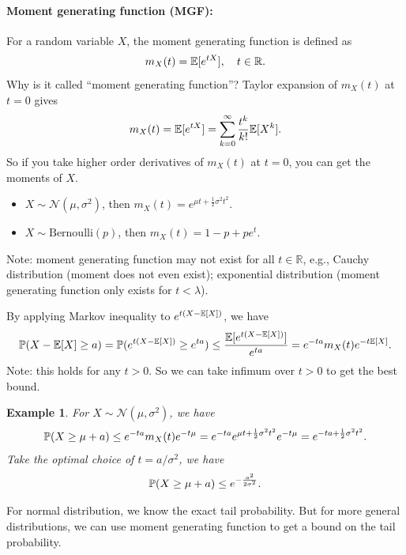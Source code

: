 \documentclass[11pt,letterpaper]{article}
\newtheorem{example}{Example}
\begin{document}
\paragraph{Moment generating function (MGF):} For a random variable $X$, the moment generating function is defined as
\begin{align*}
  m_X(t) = {\mathbb{E}} [e^{tX}], \quad t \in \mathbb{R}.
\end{align*}
Why is it called ``moment generating function''? Taylor expansion of $m_X(t)$ at $t = 0$ gives
\begin{align*}
  m_X(t) = {\mathbb{E}} [e^{tX}] = \sum_{k=0}^{\infty} \frac{t^k}{k!} {\mathbb{E}} [X^k].
\end{align*}
So if you take higher order derivatives of $m_X(t)$ at $t = 0$, you can get the moments of $X$.
\begin{itemize}
  \item $X \sim \mathcal{N} (\mu, \sigma^2)$, then $m_X(t) = e^{\mu t + \frac{1}{2} \sigma^2 t^2}$.
  \item $X \sim \text{Bernoulli}(p)$, then $m_X(t) = 1 - p + p e^t$.
\end{itemize}
Note: moment generating function may not exist for all $t \in \mathbb{R}$, e.g., Cauchy distribution (moment does not even exist); exponential distribution (moment generating function only exists for $t < \lambda$).

\bigskip

By applying Markov inequality to $e^{t (X - {\mathbb{E}} [X])}$, we have
\begin{align*}
  {\mathbb{P}} (X - {\mathbb{E}} [X] \geq a) = {\mathbb{P}} (e^{t (X - {\mathbb{E}} [X])} \geq e^{ta}) \leq \frac{{\mathbb{E}} [e^{t (X - {\mathbb{E}} [X])}]}{e^{ta}} = e^{-ta} m_X(t) e^{-t{\mathbb{E}} [X]}.
\end{align*}
Note: this holds for any $t > 0$. So we can take infimum over $t > 0$ to get the best bound.

\begin{example}
  For $X \sim \mathcal{N} (\mu, \sigma^2)$, we have
  \begin{align*}
    {\mathbb{P}} (X \geq \mu + a) \leq e^{- ta} m_X(t) e^{-t\mu} = e^{-ta} e^{\mu t + \frac{1}{2} \sigma^2 t^2} e^{-t\mu} = e^{-ta + \frac{1}{2} \sigma^2 t^2}.
  \end{align*}
  Take the optimal choice of $t = a / \sigma^2$, we have
  \begin{align*}
    {\mathbb{P}} (X \geq \mu + a) \leq e^{- \frac{a^2}{2\sigma^2}}.
  \end{align*}
\end{example}
For normal distribution, we know the exact tail probability. But for more general distributions, we can use moment generating function to get a bound on the tail probability.
\end{document}

